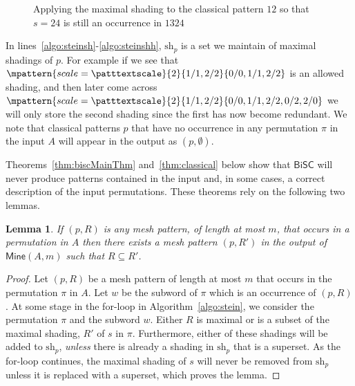\documentclass[a4paper]{article}
\newcommand{\mine}{\mathsf{Mine}}
\newcommand{\bisc}{\mathsf{BiSC}}
\newcommand{\sh}{\mathrm{sh}}
\newtheorem{lemma}[theorem]{Lemma}
\begin{document}
\begin{figure}[htp]
  \begin{center}
     \qquad {}
    \caption{Applying the maximal shading to the classical pattern $12$ so that $s = 24$ is still an occurrence in $1324$}
    \label{fig:mineEx}
  \end{center}
\end{figure}
\noindent
In lines~\ref{algo:steinsh}-\ref{algo:steinshh}, $\sh_p$ is a set we maintain of maximal shadings of $p$. For example
if we see that
$
  \mpattern{scale=\patttextscale}{ 2 }{ 1/1, 2/2 }{0/0,1/1,2/2}
$
is an allowed shading, and then later come across
$
  \mpattern{scale=\patttextscale}{ 2 }{ 1/1, 2/2 }{0/0,1/1,2/2,0/2,2/0}
$
we will only store the second shading since the first has now become redundant.
We note that classical patterns $p$ that have no occurrence in any permutation $\pi$ in the input $A$
will appear in the output as $(p,\emptyset)$.

Theorems~\ref{thm:biscMainThm} and~\ref{thm:classical} below show that $\bisc$
will never produce patterns contained in the input and, in some cases, a correct description of the input permutations. These theorems rely on the
following two lemmas.

\begin{lemma} \label{lem:R'}
  If $(p,R)$ is any mesh pattern, of length at most $m$, that occurs in a permutation in $A$
  then there exists a mesh pattern $(p,R')$ in the output of $\mine(A,m)$ such that $R \subseteq R'$.
\end{lemma}

\begin{proof}
  Let $(p,R)$ be a mesh pattern of length at most $m$ that occurs in the permutation $\pi$
  in $A$. Let $w$ be the subword of $\pi$ which is an occurrence of $(p, R)$.
  At some stage in the for-loop in Algorithm~\ref{algo:stein}, we consider the permutation $\pi$ and the
  subword $w$. Either $R$ is maximal or is a subset of the maximal shading, $R'$ of $s$ in $\pi$.
  Furthermore, either of these shadings will be added to $\sh_p$, \emph{unless} there is already
  a shading in $\sh_p$ that is a superset. As the for-loop continues, the maximal shading of $s$ will
  never be removed from $\sh_p$ unless it is replaced with a superset, which proves the lemma.
\end{proof}
\end{document}
